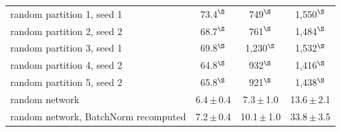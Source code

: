 \begin{table}[t]
\begin{tabular*}{\linewidth}{@{\extracolsep{\fill}}lccc@{}}
\quad random partition 1, seed 1 & 73.4$^{\S}$ & 749$^{\S}$ & 1{,}550$^{\S}$ \\
\quad random partition 2, seed 2 & 68.7$^{\S}$ & 761$^{\S}$ & 1{,}484$^{\S}$ \\
\quad random partition 3, seed 1 & 69.8$^{\S}$ & 1{,}230$^{\S}$ & 1{,}532$^{\S}$ \\
\quad random partition 4, seed 2 & 64.8$^{\S}$ & 932$^{\S}$ & 1{,}416$^{\S}$ \\
\quad random partition 5, seed 2 & 65.8$^{\S}$ & 921$^{\S}$ & 1{,}438$^{\S}$ \\
random network & 6.4\,$\pm$\,0.4 & 7.3\,$\pm$\,1.0 & 13.6\,$\pm$\,2.1 \\
random network, BatchNorm recomputed & 7.2\,$\pm$\,0.4 & 10.1\,$\pm$\,1.0 & 33.8\,$\pm$\,3.5 \\
\bottomrule
\end{tabular*}
\end{table}
